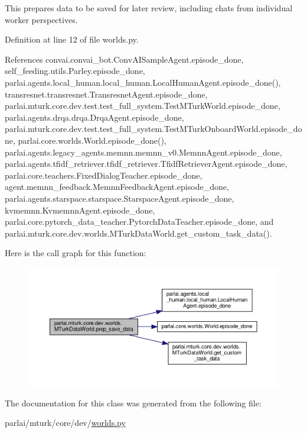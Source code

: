 \begin{DoxyVerb}This prepares data to be saved for later review, including
chats from individual worker perspectives.\end{DoxyVerb}
 

Definition at line 12 of file worlds.\+py.



References convai.\+convai\+\_\+bot.\+Conv\+A\+I\+Sample\+Agent.\+episode\+\_\+done, self\+\_\+feeding.\+utils.\+Parley.\+episode\+\_\+done, parlai.\+agents.\+local\+\_\+human.\+local\+\_\+human.\+Local\+Human\+Agent.\+episode\+\_\+done(), transresnet.\+transresnet.\+Transresnet\+Agent.\+episode\+\_\+done, parlai.\+mturk.\+core.\+dev.\+test.\+test\+\_\+full\+\_\+system.\+Test\+M\+Turk\+World.\+episode\+\_\+done, parlai.\+agents.\+drqa.\+drqa.\+Drqa\+Agent.\+episode\+\_\+done, parlai.\+mturk.\+core.\+dev.\+test.\+test\+\_\+full\+\_\+system.\+Test\+M\+Turk\+Onboard\+World.\+episode\+\_\+done, parlai.\+core.\+worlds.\+World.\+episode\+\_\+done(), parlai.\+agents.\+legacy\+\_\+agents.\+memnn.\+memnn\+\_\+v0.\+Memnn\+Agent.\+episode\+\_\+done, parlai.\+agents.\+tfidf\+\_\+retriever.\+tfidf\+\_\+retriever.\+Tfidf\+Retriever\+Agent.\+episode\+\_\+done, parlai.\+core.\+teachers.\+Fixed\+Dialog\+Teacher.\+episode\+\_\+done, agent.\+memnn\+\_\+feedback.\+Memnn\+Feedback\+Agent.\+episode\+\_\+done, parlai.\+agents.\+starspace.\+starspace.\+Starspace\+Agent.\+episode\+\_\+done, kvmemnn.\+Kvmemnn\+Agent.\+episode\+\_\+done, parlai.\+core.\+pytorch\+\_\+data\+\_\+teacher.\+Pytorch\+Data\+Teacher.\+episode\+\_\+done, and parlai.\+mturk.\+core.\+dev.\+worlds.\+M\+Turk\+Data\+World.\+get\+\_\+custom\+\_\+task\+\_\+data().

Here is the call graph for this function\+:
\nopagebreak
\begin{figure}[H]
\begin{center}
\leavevmode
\includegraphics[width=350pt]{classparlai_1_1mturk_1_1core_1_1dev_1_1worlds_1_1MTurkDataWorld_ab37222b5a1e607c5f8f301de880241f2_cgraph}
\end{center}
\end{figure}


The documentation for this class was generated from the following file\+:\begin{DoxyCompactItemize}
\item 
parlai/mturk/core/dev/\hyperlink{parlai_2mturk_2core_2dev_2worlds_8py}{worlds.\+py}\end{DoxyCompactItemize}
